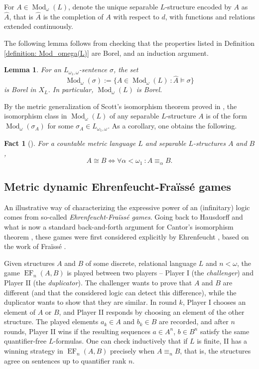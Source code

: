 \documentclass[12pt]{amsart}
\newtheorem{lemma}[theorem]{Lemma}
\newtheorem{fact}[theorem]{Fact}
\DeclareMathOperator{\Mod}{Mod}
\DeclareMathOperator{\EF}{EF}
\begin{document}
For $A\in\Mod_\omega(L)$, denote the unique separable $L$-structure encoded by $A$ as $\widehat{A}$, that is $\widehat{A}$ is the completion of $A$ with respect to $d$, with functions and relations extended continuously.

The following lemma follows from checking that the properties listed in Definition \ref{definition: Mod_omega(L)} are Borel, and an induction argument.

\begin{lemma}\label{lem: set of separable models is Borel}
    For an $L_{\omega_1, \omega}$-sentence $\sigma$, the set \[ \Mod_\omega(\sigma):=\{A\in\Mod_\omega(L) ~\colon \widehat{A}\models \sigma\} \] is Borel in $X_L$. In particular, $\Mod_\omega(L)$ is Borel.
\end{lemma}
By the metric generalization of Scott's isomorphism theorem proved in \cite[Theorem 1.2]{yaacov2017metric}, the isomorphism class in $\Mod_\omega(L)$ of any separable $L$-structure $A$ is of the form $\Mod_\omega(\sigma_A)$ for some $\sigma_A\in L_{\omega_1, \omega}$. As a corollary, one obtains the following.

\begin{fact}[{\cite[Theorem 1.2]{yaacov2017metric}}] \label{theorem:metric_scott_iso}
    For a countable metric language $L$ and separable $L$-structures $A$ and $B$,
    \[A\cong B\iff \forall\alpha<\omega_1 ~\colon A\equiv_\alpha B.\]
\end{fact}

\subsection{Metric dynamic Ehrenfeucht-Fra\"iss\'e games}\label{subsection:metric_games}

An illustrative way of characterizing the expressive power of an (infinitary) logic comes from so-called \textit{Ehrenfeucht-Fra\"iss\'e games}. Going back to Hausdorff and what is now a standard back-and-forth argument for Cantor's isomorphism theorem \cite[Section 4.7]{hausdorff_grundzuege}, these games were first considered explicitly by Ehrenfeucht \cite{ehrenfeucht1957application}, based on the work of Fra\"iss\'e \cite{fraisse1955quelques}. 

Given structures $A$ and $B$ of some discrete, relational language $L$ and $n<\omega$, the game $\EF_n(A,B)$ is played between two players -- Player I (the \textit{challenger}) and Player II (the \textit{duplicator}). The challenger wants to prove that $A$ and $B$ are different (and that the considered logic can detect this difference), while the duplicator wants to show that they are similar. In round $k$, Player I chooses an element of $A$ or $B$, and Player II responds by choosing an element of the other structure. The played elements $a_k\in A$ and $b_k\in B$ are recorded, and after $n$ rounds, Player II wins if the resulting sequences $a\in A^n$, $b\in B^n$ satisfy the same quantifier-free $L$-formulas. One can check inductively that if $L$ is finite, II has a winning strategy in $\EF_n(A,B)$ precisely when $A\equiv_n B$, that is, the structures agree on sentences up to quantifier rank $n$. 
\end{document}
